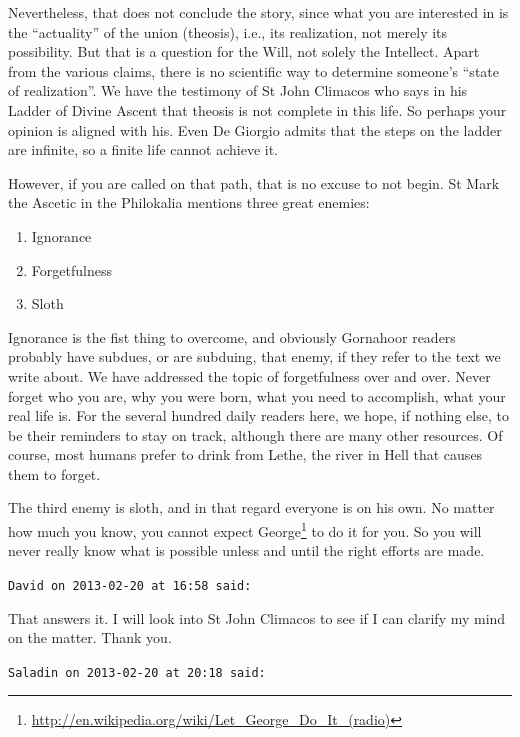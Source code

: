\begin{footnotesize}
\begin{sffamily}
Nevertheless, that does not conclude the story, since what you are interested in is the ``actuality'' of the union (theosis), i.e., its realization, not merely its possibility. But that is a question for the Will, not solely the Intellect. Apart from the various claims, there is no scientific way to determine someone's ``state of realization''. We have the testimony of St John Climacos who says in his Ladder of Divine Ascent that theosis is not complete in this life. So perhaps your opinion is aligned with his. Even De Giorgio admits that the steps on the ladder are infinite, so a finite life cannot achieve it.

However, if you are called on that path, that is no excuse to not begin. St Mark the Ascetic in the Philokalia mentions three great enemies:

\begin{enumerate}


\item Ignorance

\item Forgetfulness

\item Sloth
\end{enumerate}


Ignorance is the fist thing to overcome, and obviously Gornahoor readers probably have subdues, or are subduing, that enemy, if they refer to the text we write about. We have addressed the topic of forgetfulness over and over. Never forget who you are, why you were born, what you need to accomplish, what your real life is. For the several hundred daily readers here, we hope, if nothing else, to be their reminders to stay on track, although there are many other resources. Of course, most humans prefer to drink from Lethe, the river in Hell that causes them to forget.

The third enemy is sloth, and in that regard everyone is on his own. No matter how much you know, you cannot expect George\footnote{\url{http://en.wikipedia.org/wiki/Let_George_Do_It_(radio)}} to do it for you. So you will never really know what is possible unless and until the right efforts are made.

\hfill

\texttt{David on 2013-02-20 at 16:58 said:}

That answers it. I will look into St John Climacos to see if I can clarify my mind on the matter. Thank you.

\hfill

\texttt{Saladin on 2013-02-20 at 20:18 said:}


\end{sffamily}
\end{footnotesize}
